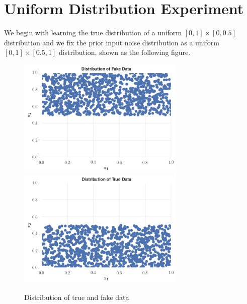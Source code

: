 \section{Uniform Distribution Experiment}
We begin with learning the true distribution of a uniform $[0,1] \times [0,0.5]$ distribution and we fix the prior input noise distribution as a uniform $[0,1] \times [0.5,1]$ distribution, shown as the following figure.\\
\begin{figure}[h]
    \centering
\includegraphics[width = 8cm]{Fake Uniform Distribution.png}
\includegraphics[width = 8cm]{True Uniform Distribution.png}
\caption{Distribution of true and fake data}
    \label{fig:uniform_distri}
\end{figure}
